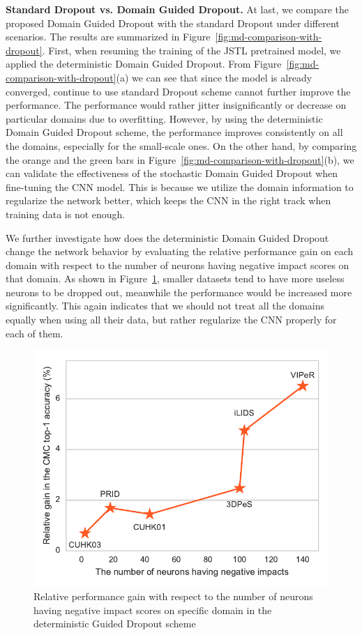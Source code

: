 \textbf{Standard Dropout vs. Domain Guided Dropout.} At last, we compare the proposed Domain Guided Dropout with the standard Dropout under different scenarios. The results are summarized in Figure~\ref{fig:md-comparison-with-dropout}. First, when resuming the training of the JSTL pretrained model, we applied the deterministic Domain Guided Dropout. From Figure~\ref{fig:md-comparison-with-dropout}(a) we can see that since the model is already converged, continue to use standard Dropout scheme cannot further improve the performance. The performance would rather jitter insignificantly or decrease on particular domains due to overfitting. However, by using the deterministic Domain Guided Dropout scheme, the performance improves consistently on all the domains, especially for the small-scale ones. On the other hand, by comparing the orange and the green bars in Figure~\ref{fig:md-comparison-with-dropout}(b), we can validate the effectiveness of the stochastic Domain Guided Dropout when fine-tuning the CNN model. This is because we utilize the domain information to regularize the network better, which keeps the CNN in the right track when training data is not enough.

We further investigate how does the deterministic Domain Guided Dropout change the network behavior by evaluating the relative performance gain on each domain with respect to the number of neurons having negative impact scores on that domain. As shown in Figure~\ref{fig:md-gain-wrt-neg-neurons}, smaller datasets tend to have more useless neurons to be dropped out, meanwhile the performance would be increased more significantly. This again indicates that we should not treat all the domains equally when using all their data, but rather regularize the CNN properly for each of them.

\begin{figure}[t]
\begin{center}
\includegraphics[width=1.0\linewidth]{figures/multi_domain/gain_wrt_neg_neurons.pdf}
\end{center}
\caption{Relative performance gain with respect to the number of neurons having negative impact scores on specific domain in the deterministic Guided Dropout scheme}
\label{fig:md-gain-wrt-neg-neurons}
\end{figure}

